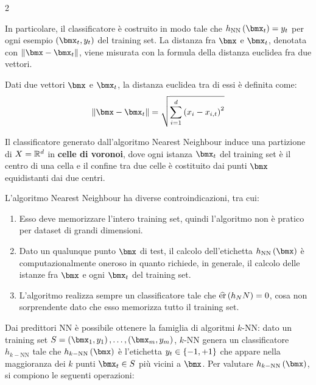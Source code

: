 \documentclass[\main/main.tex]{subfiles}
\begin{document}
\begin{multicols}{2}
\begin{definition}
        In particolare, il classificatore è costruito in modo tale che \(\hNN{\bmx_t} = y_t\) per ogni esempio \(\rnd{\bmx_t, y_t}\) del training set. La distanza fra \(\bmx\) e \(\bmx_t\), denotata con \(\norm{\bmx - \bmx_t}\), viene misurata con la formula della distanza euclidea fra due vettori.
    \end{definition}
    \begin{definition}
        Dati due vettori \(\bmx\) e \(\bmx_t\), la distanza euclidea tra di essi è definita come:
        \[
            \norm{\bmx - \bmx_t} = \sqrt{\sum_{i=1}^d\rnd{x_i - x_{i,t}}^2}
        \]
    \end{definition}
    \begin{definition}
        Il classificatore generato dall'algoritmo Nearest Neighbour induce una partizione di \(X = \mathbb{R}^d\) in \textbf{celle di voronoi}, dove ogni istanza \(\bmx_t\) del training set è il centro di una cella e il confine tra due celle è costituito dai punti \(\bmx\) equidistanti dai due centri.
    \end{definition}
    \begin{observation}
        L'algoritmo Nearest Neighbour ha diverse controindicazioni, tra cui:
        \begin{enumerate}
            \item Esso deve memorizzare l'intero training set, quindi l'algoritmo non è pratico per dataset di grandi dimensioni.
            \item Dato un qualunque punto \(\bmx\) di test, il calcolo dell'etichetta \(\hNN{\bmx}\) è computazionalmente oneroso in quanto richiede, in generale, il calcolo delle istanze fra \(\bmx\) e ogni \(\bmx_t\) del training set.
            \item L'algoritmo realizza sempre un classificatore tale che \(\widehat{\text{er}}\left(h_NN\right) = 0\), cosa non sorprendente dato che esso memorizza tutto il training set.
        \end{enumerate}
    \end{observation}
    \begin{definition}[Algoritmi \(k\)-NN]
        Dai predittori NN è possibile ottenere la famiglia di algoritmi \(k\)-NN: dato un training set \(S = \examples{m}\), \(k\)-NN genera un classificatore \(h_{k-\text{NN}}\) tale che \(\hkNN{\bmx}\) è l'etichetta \(y_t \in \left\{-1, +1\right\}\) che appare nella maggioranza dei \(k\) punti \(\bmx_t \in S\) più vicini a \(\bmx\). Per valutare \(\hkNN{\bmx}\), si compiono le seguenti operazioni:

\end{definition}
\end{multicols}
\end{document}
